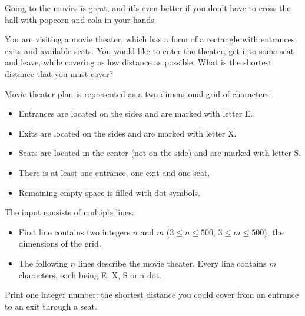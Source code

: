 \problemname{\problemyamlname}


\newcommand{\minn}{3}
\newcommand{\maxn}{500}
\newcommand{\minm}{3}
\newcommand{\maxm}{500}

Going to the movies is great, and it's even better if you don't have to cross the hall with popcorn and cola in your hands.

You are visiting a movie theater, which has a form of a rectangle with entrances, exits and available seats. You would like to enter the theater, get into some seat and leave, while covering as low distance as possible. What is the shortest distance that you must cover?

Movie theater plan is represented as a two-dimensional grid of characters:
\begin{itemize}
    \item Entrances are located on the sides and are marked with letter E.
    \item Exits are located on the sides and are marked with letter X.
    \item Seats are located in the center (not on the side) and are marked with letter S.
    \item There is at least one entrance, one exit and one seat.
    \item Remaining empty space is filled with dot symbols.
\end{itemize}

\begin{Input}
    The input consists of multiple lines:
    \begin{itemize}
        \item First line contains two integers $n$ and $m$ ($\minn \leq n \leq \maxn$, $\minm \leq m \leq \maxm$), the dimensions of the grid.
        \item The following $n$ lines describe the movie theater. Every line contains $m$ characters, each being E, X, S or a dot.
     \end{itemize}
\end{Input}

\begin{Output}
    Print one integer number: the shortest distance you could cover from an entrance to an exit through a seat.
\end{Output}
